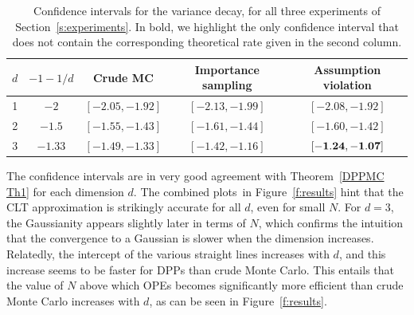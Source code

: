 \documentclass[a4paper,11pt]{article}
\newcommand{\cmark}{\ding{51}}%
\newcommand{\xmark}{\ding{55}}%
\numberwithin{equation}{section}
\theoremstyle{definition}
\newcommand{\rev}[1]{#1}
\begin{document}
\begin{table}[!h]
\centering
\begin{tabular}{|c|c|c|c|c|}
\hline
$d$ & $-1-1/d$ & Crude MC & Importance sampling & Assumption violation \\
\hline
\hline
1 & $-2$ & $[-2.05, -1.92]$ & $[-2.13, -1.99]$ & $[-2.08, -1.92]$\\
2 & $-1.5$ & $[-1.55, -1.43]$ & $[-1.61, -1.44]$ & $[-1.60, -1.42]$\\
3 & $-1.33$ & $[-1.49, -1.33]$ & $[-1.42, -1.16]$ & $\bf{[-1.24, -1.07]}$\\
\hline
\end{tabular}
\caption{\rev{Confidence intervals for the variance decay, for all three experiments of Section~\ref{s:experiments}. In bold, we highlight the only confidence interval that does not contain the corresponding theoretical rate given in the second column.}}
\label{t:confidenceIntervals}
\end{table}




The confidence intervals are in very good agreement with Theorem~\ref{DPPMC Th1} for each dimension $d$. The combined plots in Figure~\ref{f:results} hint that the CLT
approximation is strikingly accurate for all $d$, even for small $N$. For $d=3$, the Gaussianity appears slightly later in terms of $N$, which confirms the intuition that the convergence to a Gaussian is slower when the dimension increases. \rev{Relatedly, the intercept of the various straight lines increases with $d$, and this increase seems to be faster for DPPs than crude Monte Carlo. This entails that the value of $N$ above which OPEs becomes significantly more efficient than crude Monte Carlo increases with $d$, as can be seen in Figure~\ref{f:results}.}
\end{document}
